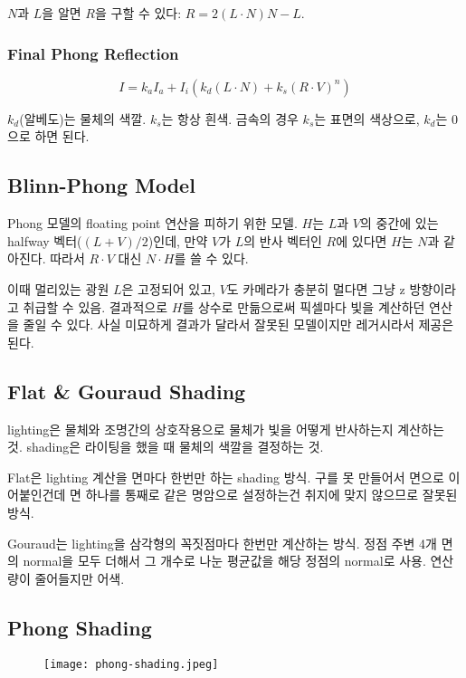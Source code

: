 $N$과 $L$을 알면 $R$을 구할 수 있다: $R = 2(L \cdot N)N - L$.

\subsubsection{Final Phong Reflection}

$$
I = k_aI_a + I_i(k_d(L \cdot N) + k_s(R \cdot V)^n)
$$

$k_d$(알베도)는 물체의 색깔. $k_s$는 항상 흰색. 금속의 경우 $k_s$는 표면의 색상으로, $k_d$는 0으로 하면 된다.

\subsection{Blinn-Phong Model}

Phong 모델의 floating point 연산을 피하기 위한 모델. $H$는 $L$과 $V$의 중간에 있는 halfway 벡터($(L + V) / 2$)인데, 만약 $V$가 $L$의 반사 벡터인 $R$에 있다면 $H$는 $N$과 같아진다. 따라서 $R \cdot V$ 대신 $N \cdot H$를 쓸 수 있다.

이때 멀리있는 광원 $L$은 고정되어 있고, $V$도 카메라가 충분히 멀다면 그냥 z 방향이라고 취급할 수 있음. 결과적으로 $H$를 상수로 만듦으로써 픽셀마다 빛을 계산하던 연산을 줄일 수 있다. 사실 미묘하게 결과가 달라서 잘못된 모델이지만 레거시라서 제공은 된다.

\subsection{Flat \& Gouraud Shading}

lighting은 물체와 조명간의 상호작용으로 물체가 빛을 어떻게 반사하는지 계산하는 것. shading은 라이팅을 했을 때 물체의 색깔을 결정하는 것.

Flat은 lighting 계산을 면마다 한번만 하는 shading 방식. 구를 못 만들어서 면으로 이어붙인건데 면 하나를 통째로 같은 명암으로 설정하는건 취지에 맞지 않으므로 잘못된 방식.

Gouraud는 lighting을 삼각형의 꼭짓점마다 한번만 계산하는 방식. 정점 주변 4개 면의 normal을 모두 더해서 그 개수로 나눈 평균값을 해당 정점의 normal로 사용. 연산량이 줄어들지만 어색.

\subsection{Phong Shading}

\begin{figure}[h]
  \centering
  \texttt{[image: phong-shading.jpeg]}
\end{figure}

